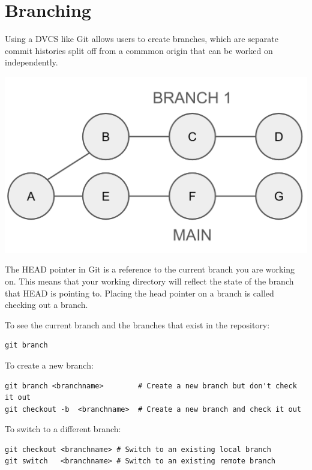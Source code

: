 \documentclass[fleqn]{article}
\begin{document}
\pagebreak

\section*{Branching}

Using a DVCS like Git allows users to create branches, which are separate
commit histories split off from a commmon origin that can be worked on
independently. 

\begin{center}
    \includegraphics[scale=0.3]{figs/branch.png}
\end{center}

The HEAD pointer in Git is a reference to the current branch you are working on.
This means that your working directory will reflect the state of the branch
that HEAD is pointing to. Placing the head pointer on a branch is called
checking out a branch.

To see the current branch and the branches that exist in the repository:

\begin{lstlisting}
git branch
\end{lstlisting}

To create a new branch:

\begin{lstlisting}
git branch <branchname>        # Create a new branch but don't check it out
git checkout -b  <branchname>  # Create a new branch and check it out
\end{lstlisting}

To switch to a different branch:

\begin{lstlisting}
git checkout <branchname> # Switch to an existing local branch
git switch   <branchname> # Switch to an existing remote branch
\end{lstlisting}
\end{document}
